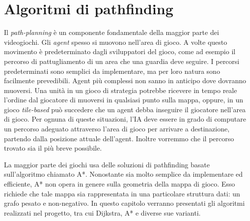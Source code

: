 \documentclass[11pt]{book}
\begin{document}
\chapter{Algoritmi di pathfinding}
\par{Il \emph{path-planning} \`e un componente fondamentale della maggior parte dei videogiochi.
Gli \emph{agent} spesso si muovono nell'area di gioco. A volte questo movimento \`e predeterminato dagli sviluppatori del gioco, come ad esempio il percorso di pattugliamento di un area che una guardia deve seguire. I percorsi predeterminati sono semplici da implementare, ma per loro natura sono facilmente prevedibili. Agent pi\`u complessi non sanno in anticipo dove dovranno muoversi. Una unit\`a in un gioco di strategia potrebbe ricevere in tempo reale l'ordine dal giocatore di muoversi in qualsiasi punto sulla mappa, oppure, in un gioco \emph{tile-based} pu\`o succedere che un agent debba inseguire il giocatore nell'area di gioco.
Per ognuna di queste situazioni, l'IA deve essere in grado di computare un percorso adeguato attraverso l'area di gioco per arrivare a destinazione, partendo dalla posizione attuale dell'agent. Inoltre vorremmo che il percorso trovato sia il pi\`u breve possibile.}
\par{La maggior parte dei giochi usa delle soluzioni di pathfinding basate sull'algoritmo chiamato A*. Nonostante sia molto semplice da implementare ed efficiente, A* non opera in genere sulla geometria della mappa di gioco. Esso richiede che tale mappa sia rappresentata in una particolare struttura dati: un grafo pesato e non-negativo.
In questo capitolo verranno presentati gli algoritmi realizzati nel progetto, tra cui Dijkstra, A* e diverse sue varianti.}
\end{document}
